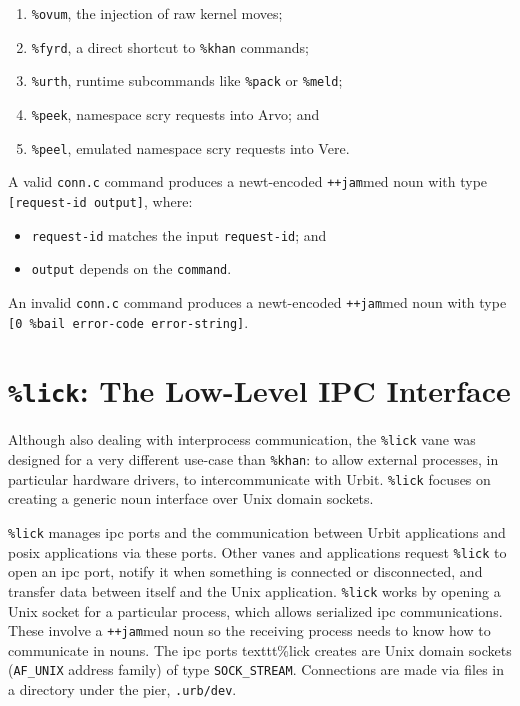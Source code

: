 \documentclass[twoside]{article}
\begin{document}
\begin{enumerate}
  \item \texttt{\%ovum}, the injection of raw kernel moves;
  \item \texttt{\%fyrd}, a direct shortcut to \texttt{\%khan} commands;
  \item \texttt{\%urth}, runtime subcommands like \texttt{\%pack} or \texttt{\%meld};
  \item \texttt{\%peek}, namespace scry requests into Arvo; and
  \item \texttt{\%peel}, emulated namespace scry requests into Vere.
\end{enumerate}
\noindent
A valid \texttt{conn.c} command produces a newt-encoded \lstinline[style=inlinecode]{++jam}med noun with type \lstinline[style=inlinecode]{[request-id output]}, where:
\begin{itemize}
  \item \texttt{request-id} matches the input \texttt{request-id}; and
  \item \texttt{output} depends on the \texttt{command}.
\end{itemize}
\noindent
An invalid \texttt{conn.c} command produces a newt-encoded \lstinline[style=inlinecode]{++jam}med noun with type \texttt{[0 \%bail error-code error-string]}. 


\section[{\texttt{\%lick}:  The Low-Level \textsc{\textbf{ipc}} Interface}]{\texttt{\%lick}:  The Low-Level IPC Interface}

Although also dealing with interprocess communication, the \texttt{\%lick} vane \citep{UIP-0101} was designed for a very different use-case than \texttt{\%khan}:  to allow external processes, in particular hardware drivers, to intercommunicate with Urbit.  \texttt{\%lick} focuses on creating a generic noun interface over Unix domain sockets.

\texttt{\%lick} manages {\sc ipc} ports and the communication between Urbit applications and {\sc posix} applications via these ports.  Other vanes and applications request \texttt{\%lick} to open an {\sc ipc} port, notify it when something is connected or disconnected, and transfer data between itself and the Unix application.  \texttt{\%lick} works by opening a Unix socket for a particular process, which allows serialized {\sc ipc} communications.  These involve a \lstinline[style=inlinecode]{++jam}med noun so the receiving process needs to know how to communicate in nouns.  The {\sc ipc} ports texttt{\%lick} creates are Unix domain sockets (\texttt{AF\_UNIX} address family) of type \texttt{SOCK\_STREAM}.  Connections are made via files in a directory under the pier, \texttt{.urb/dev}.
\end{document}
